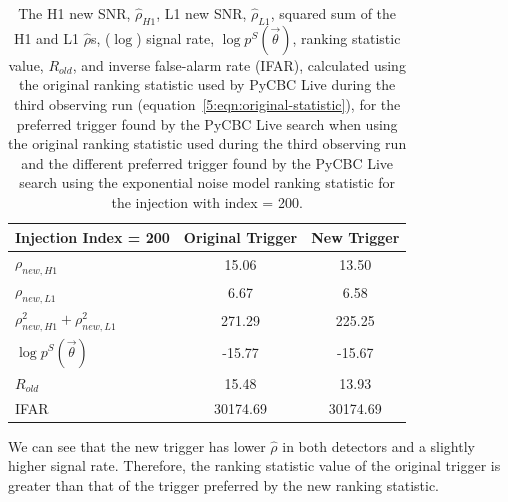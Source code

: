 %
\begin{table}[ht]
    \centering
    \begin{tabular}{lcc}
        \toprule
        \textbf{Injection Index = 200} & \textbf{Original Trigger} & \textbf{New Trigger} \\
        \midrule
        $\rho_{new, H1}$  & 15.06 & 13.50 \\
        $\rho_{new, L1}$   & 6.67 & 6.58 \\
        $\rho_{new, H1}^2 + \rho_{new, L1}^2$   & 271.29 & 225.25 \\
        $\log p^{S}(\Vec{\theta})$ & -15.77 & -15.67 \\
        $R_{old}$ & 15.48 & 13.93 \\
        IFAR & 30174.69 & 30174.69 \\
        \bottomrule
    \end{tabular}
    \caption{The H1 new SNR, $\hat{\rho}_{H1}$, L1 new SNR, $\hat{\rho}_{L1}$, squared sum of the H1 and L1 $\hat{\rho}$s, ($\log$) signal rate, $\log p^{S}(\Vec{\theta})$, ranking statistic value, $R_{old}$, and inverse false-alarm rate (IFAR), calculated using the original ranking statistic used by PyCBC Live during the third observing run (equation~\ref{5:eqn:original-statistic}), for the preferred trigger found by the PyCBC Live search when using the original ranking statistic used during the third observing run and the different preferred trigger found by the PyCBC Live search using the exponential noise model ranking statistic for the injection with index = 200.}
    \label{5:tab:200-old-stat}
\end{table}
%
We can see that the new trigger has lower $\hat{\rho}$ in both detectors and a slightly higher signal rate. Therefore, the ranking statistic value of the original trigger is greater than that of the trigger preferred by the new ranking statistic.


